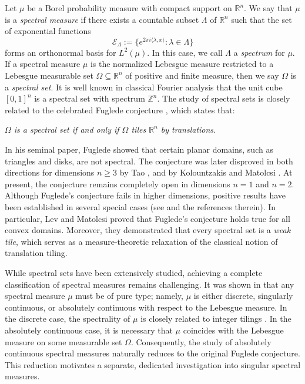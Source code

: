 \documentclass[11pt]{article}
\numberwithin{equation}{section}
\begin{document}
Let $\mu$ be a Borel probability measure with compact support on $\mathbb{R}^n$. We say that $\mu$ is a \emph{spectral measure} if there exists a countable subset $\Lambda$ of $\mathbb{R}^n$ such that the set of exponential functions
\[
\mathcal{E}_{\Lambda}:=\big\{e^{2\pi i \langle \lambda, x \rangle} : \lambda\in \Lambda\big\}
\]
forms an orthonormal basis for $L^2(\mu)$. In this case, we call $\Lambda$ a \emph{spectrum} for $\mu$. If a spectral measure $\mu$ is the normalized Lebesgue measure restricted to a Lebesgue measurable set $\Omega\subseteq\mathbb{R}^n$ of positive and finite measure, then we say $\Omega$ is a \emph{spectral set}. It is well known in classical Fourier analysis that the unit cube $[0,1]^n$ is a spectral set with spectrum $\mathbb{Z}^n$. The study of spectral sets is closely related to the celebrated Fuglede conjecture \cite{Fuglede1974}, which states that:
\begin{center}
	\textit{$\Omega$ is a spectral set if and only if $\Omega$ tiles $\mathbb{R}^n$ by translations.}
\end{center}
In his seminal paper, Fuglede showed that certain planar domains, such as triangles and disks, are not spectral. The conjecture was later disproved in both directions for dimensions $n \ge 3$ by Tao \cite{Tao2003}, and by Kolountzakis and Matolcsi \cite{Kol2006',Matolcsi2005}. At present, the conjecture remains completely open in dimensions $n = 1$ and $n = 2$. Although Fuglede's conjecture fails in higher dimensions, positive results have been established in several special cases (see \cite{Laba2001,Fan2019,IMP_2017,Shi_2019} and the references therein). In particular, Lev and Matolcsi \cite{Lev2022} proved that Fuglede's conjecture holds true for all convex domains. Moreover, they demonstrated that every spectral set is a \emph{weak tile}, which serves as a measure-theoretic relaxation of the classical notion of translation tiling.

While spectral sets have been extensively studied, achieving a complete classification of spectral measures remains challenging. It was shown in \cite{HLL_2013} that any spectral measure $\mu$ must be of pure type; namely, $\mu$ is either discrete, singularly continuous, or absolutely continuous with respect to the Lebesgue measure. In the discrete case, the spectrality of $\mu$ is closely related to integer tilings \cite{HLL_2013}. In the absolutely continuous case, it is necessary \cite{DL_2014} that $\mu$ coincides with the Lebesgue measure on some measurable set $\Omega$. Consequently, the study of absolutely continuous spectral measures naturally reduces to the original Fuglede conjecture. This reduction  motivates a separate, dedicated investigation into singular spectral measures. 
\end{document}
